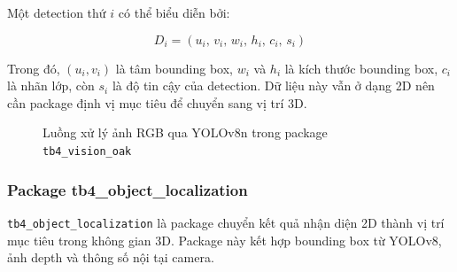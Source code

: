 Một detection thứ $i$ có thể biểu diễn bởi:

\begin{equation}
    D_i = \left(u_i,\, v_i,\, w_i,\, h_i,\, c_i,\, s_i\right)
    \label{eq:detection-format}
\end{equation}

Trong đó, $(u_i, v_i)$ là tâm bounding box, $w_i$ và $h_i$ là kích thước bounding box, $c_i$ là nhãn lớp, còn $s_i$ là độ tin cậy của detection. Dữ liệu này vẫn ở dạng 2D nên cần package định vị mục tiêu để chuyển sang vị trí 3D.

\begin{figure}[H]
\centering
{}
\caption{Luồng xử lý ảnh RGB qua YOLOv8n trong package \texttt{tb4\_vision\_oak}}
\label{fig:tb4-vision-oak-flow}
\end{figure}

\subsubsection{Package tb4\_object\_localization}
\label{subsubsec:tb4-object-localization}

\texttt{tb4\_object\_localization} là package chuyển kết quả nhận diện 2D thành vị trí mục tiêu trong không gian 3D. Package này kết hợp bounding box từ YOLOv8, ảnh depth và thông số nội tại camera.

